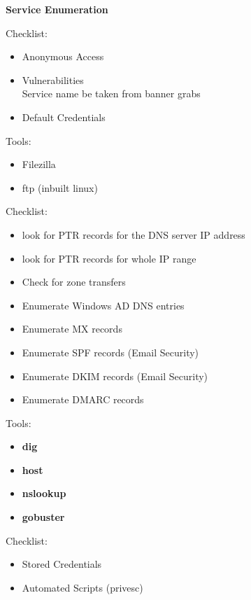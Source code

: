 \documentclass[a4paper,10pt]{article}
\begin{document}
\vspace{1cm}
\Huge{\textbf{Service Enumeration}}
\newline
\normalsize
\begin{multicols}{2}
\begin{tcolorbox}[breakable, title=FTP]
Checklist:
\begin{itemize}
	\item Anonymous Access
	\item Vulnerabilities\\ Service name be taken from banner grabs
	\item Default Credentials
\end{itemize}
Tools:
\begin{itemize}
	\item Filezilla
	\item ftp (inbuilt linux)
\end{itemize}
\end{tcolorbox}
\begin{tcolorbox}[breakable, title=DNS]
Checklist:
\begin{itemize}
	\itemsep0em 
	\item look for PTR records for the DNS server IP address
	\item look for PTR records for whole IP range
	\item Check for zone transfers
	\item Enumerate Windows AD DNS entries
	\item Enumerate MX records
	\item Enumerate SPF records (Email Security)
	\item Enumerate DKIM records (Email Security)
	\item Enumerate DMARC records
\end{itemize}
Tools:
\begin{itemize}
	\itemsep0em 
	\item \textbf{dig}
	\item \textbf{host}
	\item \textbf{nslookup}
	\item \textbf{gobuster}
\end{itemize}
\end{tcolorbox}
\begin{tcolorbox}[breakable,title=Group Policy]
Checklist:
\begin{itemize}
	\itemsep0em
	\item Stored Credentials
	\item Automated Scripts (privesc)
\end{itemize}

\end{tcolorbox}
\end{multicols}
\end{document}
